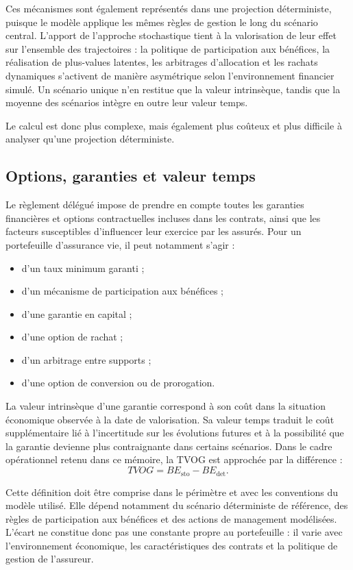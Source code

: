 Ces mécanismes sont également représentés dans une projection déterministe,
puisque le modèle applique les mêmes règles de gestion le long du scénario
central. L'apport de l'approche stochastique tient à la valorisation de leur
effet sur l'ensemble des trajectoires : la politique de participation aux
bénéfices, la réalisation de plus-values latentes, les arbitrages d'allocation
et les rachats dynamiques s'activent de manière asymétrique selon
l'environnement financier simulé. Un scénario unique n'en restitue que la
valeur intrinsèque, tandis que la moyenne des scénarios intègre en outre leur
valeur temps.

Le calcul est donc plus complexe, mais également plus coûteux et plus difficile à
analyser qu'une projection déterministe.

\subsection{Options, garanties et valeur temps}

Le règlement délégué impose de prendre en compte toutes les garanties
financières et options contractuelles incluses dans les contrats, ainsi que les
facteurs susceptibles d'influencer leur exercice par les assurés. Pour un portefeuille d'assurance vie, il peut
notamment s'agir :

\begin{itemize}[label=\textemdash, nosep, leftmargin=2.5em]
    \item d'un taux minimum garanti ;
    \item d'un mécanisme de participation aux bénéfices ;
    \item d'une garantie en capital ;
    \item d'une option de rachat ;
    \item d'un arbitrage entre supports ;
    \item d'une option de conversion ou de prorogation.
\end{itemize}

La valeur intrinsèque d'une garantie correspond à son coût dans la situation
économique observée à la date de valorisation. Sa valeur temps traduit le coût
supplémentaire lié à l'incertitude sur les évolutions futures et à la
possibilité que la garantie devienne plus contraignante dans certains
scénarios. Dans le cadre opérationnel retenu dans ce mémoire, la TVOG est
approchée par la différence :
\[
    TVOG =
    BE_{\mathrm{sto}}-BE_{\mathrm{det}}.
\]

Cette définition doit être comprise dans le périmètre et avec les conventions
du modèle utilisé. Elle dépend notamment du scénario déterministe de référence,
des règles de participation aux bénéfices et des actions de management
modélisées. L'écart ne constitue donc pas une constante propre au portefeuille :
il varie avec l'environnement économique, les caractéristiques des contrats et
la politique de gestion de l'assureur.

